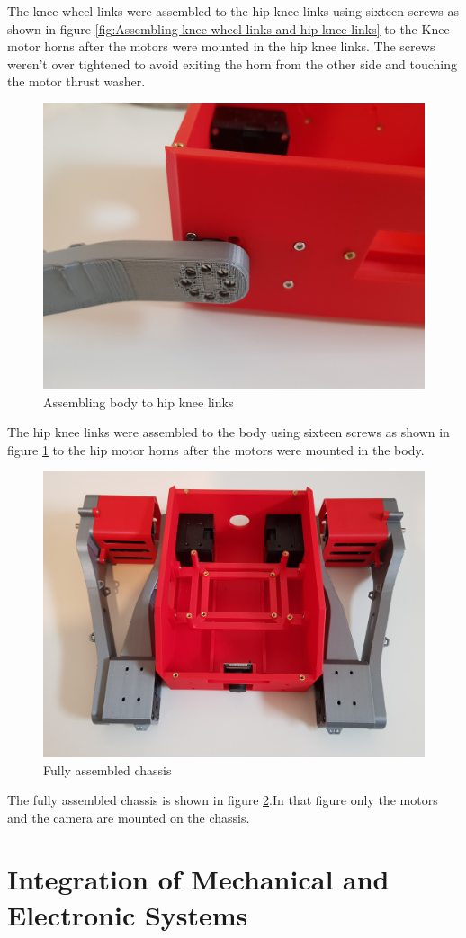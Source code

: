 The knee wheel links were assembled to the hip knee links using sixteen screws as shown in figure \ref{fig:Assembling knee wheel links and hip knee links} to the Knee motor horns after the motors were mounted in the hip knee links.
The screws weren't over tightened to avoid exiting the horn from the other side and touching the motor thrust washer.
\begin{figure}[h]
	\centering
	\includegraphics[width=0.5\linewidth]{assembling_body_hip_knee_links}
	\caption{Assembling body to hip knee links}
	\label{fig:assemblingbodyhipkneelinks}
\end{figure}

The hip knee links were assembled to the body using sixteen screws as shown in figure \ref{fig:assemblingbodyhipkneelinks} to the hip motor horns after the motors were mounted in the body.

\begin{figure}[h]
	\centering
	\includegraphics[width=0.5\linewidth]{fully_assembled_chassis}
	\caption{Fully assembled chassis}
	\label{fig:fullyassembledchassis}
\end{figure}
The fully assembled chassis is shown in figure \ref{fig:fullyassembledchassis}.In that figure only the motors and the camera are mounted on the chassis.

\section{Integration of Mechanical and Electronic Systems}
